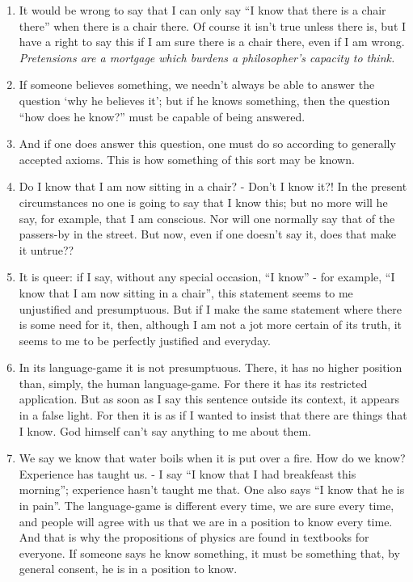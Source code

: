 \documentclass{book}
\begin{document}
\begin{enumerate}
\item
It would be wrong to say that I can only say ``I know that there is a chair
there'' when there is a chair there. Of course it isn't true unless there is,
but I have a right to say this if I am sure there is a chair there, even if I
am wrong.
\\
\emph{Pretensions are a mortgage which burdens a philosopher's capacity to
think.}

\item
If someone believes something, we needn't always be able to answer the question
`why he believes it'; but if he knows something, then the question ``how does
he know?'' must be capable of being answered.

\item
And if one does answer this question, one must do so according to generally
accepted axioms. This is how something of this sort may be known.

\item
Do I know that I am now sitting in a chair? - Don't I know it?! In the present
circumstances no one is going to say that I know this; but no more will he say,
for example, that I am conscious. Nor will one normally say that of the
passers-by in the street.  But now, even if one doesn't say it, does that make
it untrue??

\item
It is queer: if I say, without any special occasion, ``I know'' - for example,
``I know that I am now sitting in a chair'', this statement seems to me
unjustified and presumptuous. But if I make the same statement where there is
some need for it, then, although I am not a jot more certain of its truth, it
seems to me to be perfectly justified and everyday.

\item
In its language-game it is not presumptuous. There, it has no higher position
than, simply, the human language-game. For there it has its restricted
application.  But as soon as I say this sentence outside its context, it
appears in a false light. For then it is as if I wanted to insist that there
are things that I know. God himself can't say anything to me about them.

\item
We say we know that water boils when it is put over a fire. How do we know?
Experience has taught us. - I say ``I know that I had breakfeast this
morning''; experience hasn't taught me that. One also says ``I know that he is
in pain''. The language-game is different every time, we are sure every time,
and people will agree with us that we are in a position to know every time. And
that is why the propositions of physics are found in textbooks for everyone.
If someone says he know something, it must be something that, by general
consent, he is in a position to know.


\end{enumerate}
\end{document}

